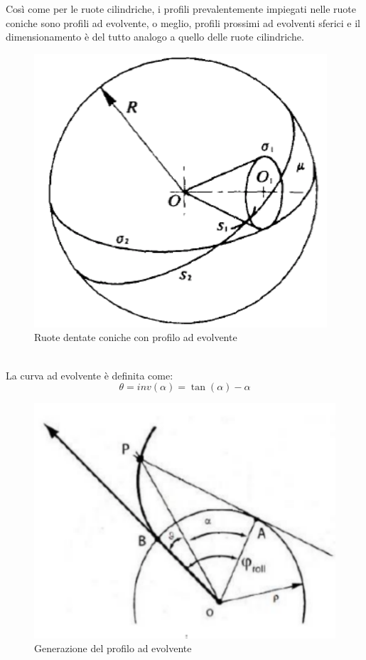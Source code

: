 Così come per le ruote cilindriche, i profili prevalentemente impiegati nelle ruote coniche sono profili ad evolvente, o meglio, profili prossimi ad evolventi sferici e il dimensionamento è del tutto analogo a quello delle ruote cilindriche. \\
\begin{figure}[h]
    \centering
    \includegraphics[scale=0.4]{Immagini/EvolventeConica.png}
    \caption{Ruote dentate coniche con profilo ad evolvente}
    \label{fig:EvolventeConica}
\end{figure}
\\
La curva ad evolvente è definita come:
\begin{equation}
    \theta=inv(\alpha)=\tan(\alpha)-\alpha
\end{equation}
\begin{figure}[h]
    \centering
    \includegraphics[scale=0.25]{Immagini/Evolvente.png}
    \caption{Generazione del profilo ad evolvente}
    \label{fig:Evolvente}
\end{figure}

